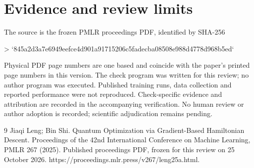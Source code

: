 \documentclass[10pt]{article}
\begin{document}
\section*{Evidence and review limits}
The source is the frozen PMLR proceedings PDF, identified by SHA-256\par
> `845a2d3a7e6949eefce4d901a91715206c5fadecba08508e988d4778d968b5ed`\par
Physical PDF page numbers are one based and coincide with the paper’s printed page numbers in this version. The check program was written for this review; no author program was executed. Published training runs, data collection and reported performance were not reproduced. Check-specific evidence and attribution are recorded in the accompanying verification. No human review or author adoption is recorded; scientific adjudication remains pending.\par
9 Jiaqi Leng; Bin Shi. Quantum Optimization via Gradient-Based Hamiltonian Descent. Proceedings of the 42nd International Conference on Machine Learning, PMLR 267 (2025). Published proceedings PDF, frozen for this review on 25 October 2026. https://proceedings.mlr.press/v267/leng25a.html.\par
\end{document}
